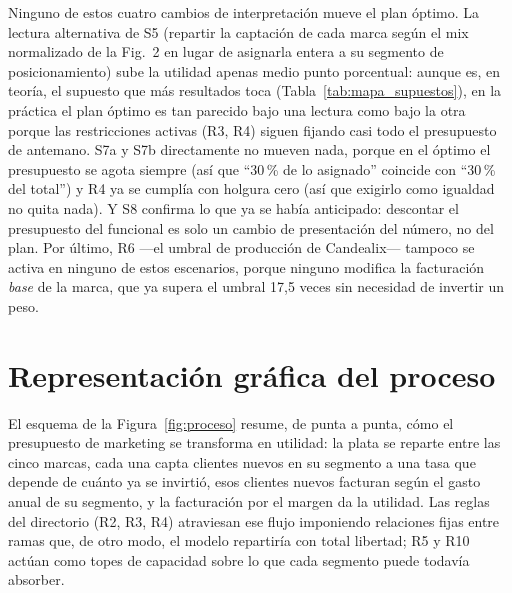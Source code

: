 \documentclass[10pt,a4paper]{article}
\begin{document}
Ninguno de estos cuatro cambios de interpretación mueve el plan óptimo. La
lectura alternativa de S5 (repartir la captación de cada marca según el mix
normalizado de la Fig.~2 en lugar de asignarla entera a su segmento de
posicionamiento) sube la utilidad apenas medio punto porcentual: aunque es,
en teoría, el supuesto que más resultados toca (Tabla~\ref{tab:mapa_supuestos}),
en la práctica el plan óptimo es tan parecido bajo una lectura como bajo la
otra porque las restricciones activas (R3, R4) siguen fijando casi todo el
presupuesto de antemano. S7a y S7b directamente no mueven nada, porque en el
óptimo el presupuesto se agota siempre (así que ``30\,\% de lo asignado''
coincide con ``30\,\% del total'') y R4 ya se cumplía con holgura cero (así
que exigirlo como igualdad no quita nada). Y S8 confirma lo que ya se había
anticipado: descontar el presupuesto del funcional es solo un cambio de
presentación del número, no del plan. Por último, R6 —el umbral de
producción de Candealix— tampoco se activa en ninguno de estos escenarios,
porque ninguno modifica la facturación \emph{base} de la marca, que ya supera
el umbral 17,5 veces sin necesidad de invertir un peso.

\section{Representación gráfica del proceso}

El esquema de la Figura~\ref{fig:proceso} resume, de punta a punta, cómo el
presupuesto de marketing se transforma en utilidad: la plata se reparte entre
las cinco marcas, cada una capta clientes nuevos en su segmento a una tasa que
depende de cuánto ya se invirtió, esos clientes nuevos facturan según el gasto
anual de su segmento, y la facturación por el margen da la utilidad. Las
reglas del directorio (R2, R3, R4) atraviesan ese flujo imponiendo relaciones
fijas entre ramas que, de otro modo, el modelo repartiría con total libertad;
R5 y R10 actúan como topes de capacidad sobre lo que cada segmento puede
todavía absorber.
\end{document}
